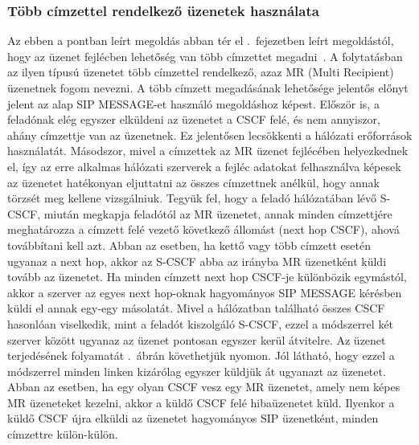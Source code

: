 \subsubsection{Több címzettel rendelkező üzenetek használata}
\label{sec:mr_message}

Az ebben a pontban leírt megoldás abban tér el .~fejezetben leírt megoldástól, hogy az üzenet fejlécben lehetőség van több címzettet megadni~\cite{springer_group_messaging}. A folytatásban az ilyen típusú üzenetet több címzettel rendelkező, azaz MR (Multi Recipient) üzenetnek fogom nevezni. A több címzett megadásának lehetősége jelentős előnyt jelent az alap SIP MESSAGE-et használó megoldáshoz képest. Először is, a feladónak elég egyszer elküldeni az üzenetet a CSCF felé, és nem annyiszor, ahány címzettje van az üzenetnek. Ez jelentősen lecsökkenti a hálózati erőforrások használatát. Másodszor, mivel a címzettek az MR üzenet fejlécében helyezkednek el, így az erre alkalmas hálózati szerverek a fejléc adatokat felhasználva képesek az üzenetet hatékonyan eljuttatni az összes címzettnek anélkül, hogy annak törzsét meg kellene vizsgálniuk. Tegyük fel, hogy a feladó hálózatában lévő S-CSCF, miután megkapja feladótól az MR üzenetet, annak minden címzettjére meghatározza a címzett felé vezető következő állomást (next hop CSCF), ahová továbbítani kell azt. Abban az esetben, ha kettő vagy több címzett esetén ugyanaz a next hop, akkor az S-CSCF abba az irányba MR üzenetként küldi tovább az üzenetet. Ha minden címzett next hop CSCF-je különbözik egymástól, akkor a szerver az egyes next hop-oknak hagyományos SIP MESSAGE kérésben küldi el annak egy-egy másolatát. Mivel a hálózatban található összes CSCF hasonlóan viselkedik, mint a feladót kiszolgáló S-CSCF, ezzel a módszerrel két szerver között ugyanaz az üzenet pontosan egyszer kerül átvitelre. Az üzenet terjedésének folyamatát .~ábrán követhetjük nyomon. Jól látható, hogy ezzel a módszerrel minden linken kizárólag egyszer küldjük át ugyanazt az üzenetet. Abban az esetben, ha egy olyan CSCF vesz egy MR üzenetet, amely nem képes MR üzeneteket kezelni, akkor a küldő CSCF felé hibaüzenetet küld. Ilyenkor a küldő CSCF újra elküldi az üzenetet hagyományos SIP üzenetként, minden címzettre külön-külön. 

